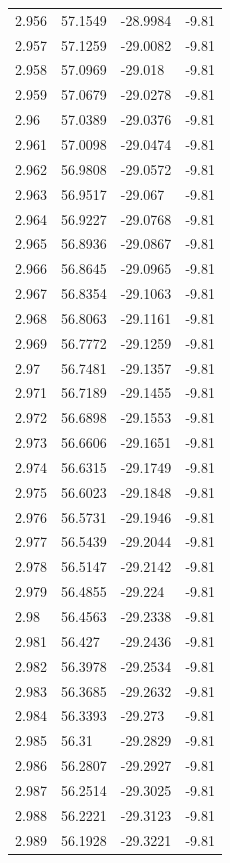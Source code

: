 \begin{tabular}{llll}
2.956 & 57.1549 & -28.9984 & -9.81 \\
2.957 & 57.1259 & -29.0082 & -9.81 \\
2.958 & 57.0969 & -29.018 & -9.81 \\
2.959 & 57.0679 & -29.0278 & -9.81 \\
2.96 & 57.0389 & -29.0376 & -9.81 \\
2.961 & 57.0098 & -29.0474 & -9.81 \\
2.962 & 56.9808 & -29.0572 & -9.81 \\
2.963 & 56.9517 & -29.067 & -9.81 \\
2.964 & 56.9227 & -29.0768 & -9.81 \\
2.965 & 56.8936 & -29.0867 & -9.81 \\
2.966 & 56.8645 & -29.0965 & -9.81 \\
2.967 & 56.8354 & -29.1063 & -9.81 \\
2.968 & 56.8063 & -29.1161 & -9.81 \\
2.969 & 56.7772 & -29.1259 & -9.81 \\
2.97 & 56.7481 & -29.1357 & -9.81 \\
2.971 & 56.7189 & -29.1455 & -9.81 \\
2.972 & 56.6898 & -29.1553 & -9.81 \\
2.973 & 56.6606 & -29.1651 & -9.81 \\
2.974 & 56.6315 & -29.1749 & -9.81 \\
2.975 & 56.6023 & -29.1848 & -9.81 \\
2.976 & 56.5731 & -29.1946 & -9.81 \\
2.977 & 56.5439 & -29.2044 & -9.81 \\
2.978 & 56.5147 & -29.2142 & -9.81 \\
2.979 & 56.4855 & -29.224 & -9.81 \\
2.98 & 56.4563 & -29.2338 & -9.81 \\
2.981 & 56.427 & -29.2436 & -9.81 \\
2.982 & 56.3978 & -29.2534 & -9.81 \\
2.983 & 56.3685 & -29.2632 & -9.81 \\
2.984 & 56.3393 & -29.273 & -9.81 \\
2.985 & 56.31 & -29.2829 & -9.81 \\
2.986 & 56.2807 & -29.2927 & -9.81 \\
2.987 & 56.2514 & -29.3025 & -9.81 \\
2.988 & 56.2221 & -29.3123 & -9.81 \\
2.989 & 56.1928 & -29.3221 & -9.81 \\

\end{tabular}
